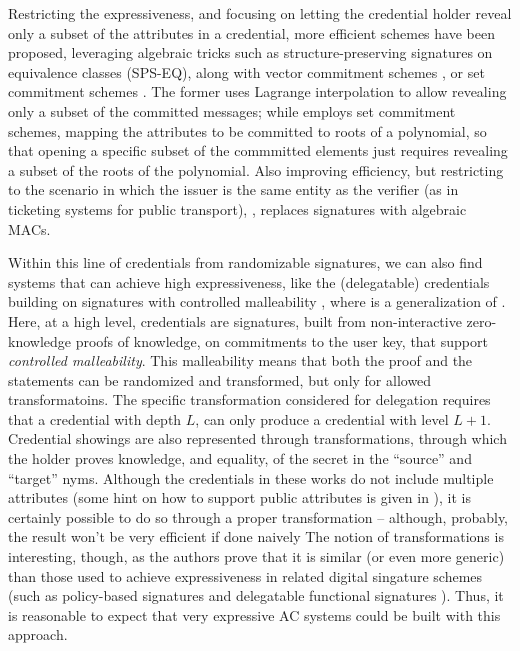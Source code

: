 Restricting the expressiveness, and focusing on letting the credential holder
reveal only a subset of the attributes in a credential, more efficient schemes
have been proposed, leveraging algebraic tricks such as structure-preserving
signatures on equivalence classes (SPS-EQ), along with vector commitment schemes
\cite{cdhk15}, or set commitment schemes \cite{fhs19}. The former uses Lagrange
interpolation to allow revealing only a subset of the committed messages;
while \cite{fhs19} employs set commitment schemes, mapping the attributes to
be committed to roots of a polynomial, so that opening a specific subset of the
commmitted elements just requires revealing a subset of the roots of the
polynomial.
%
Also improving efficiency, but restricting to the scenario in which the issuer
is the same entity as the verifier (as in ticketing systems for public transport),
\cite{cmz14}, replaces signatures with algebraic MACs.

Within this line of credentials from randomizable signatures, we can also find
systems that can achieve high expressiveness, like the (delegatable) credentials
building on signatures with controlled malleability \cite{bcc+09,cklm14},
where \cite{cklm14} is a generalization of \cite{bcc+09}. Here, at a high level,
credentials are signatures, built from non-interactive zero-knowledge proofs of
knowledge, on commitments to the user key, that support \emph{controlled
  malleability}. This malleability means
that both the proof and the statements can be randomized and transformed, but
only for allowed transformatoins. The specific transformation considered for
delegation requires that a credential with depth $L$, can only produce a credential
with level $L+1$. Credential showings are also represented through transformations,
through which the holder proves knowledge, and equality, of the secret in the
``source'' and ``target'' nyms. Although the credentials in these works do not
include multiple attributes (some hint on how to support public attributes is
given in \cite{bcc+09}), it is certainly possible to do so through a proper
transformation -- although, probably, the result won't be very efficient if
done naively  The notion of transformations is interesting,
though, as the authors prove that it is similar (or even more generic) than those
used to achieve expressiveness in related digital singature schemes (such as
policy-based signatures \cite{bf14} and delegatable functional signatures \cite{bms16}).
Thus, it is reasonable to expect that very expressive AC systems could be built
with this approach.

